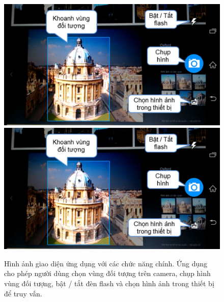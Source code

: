 \begin{figure}[!htbp]
  \begin{center}
    \leavevmode
    \ifpdf
      \includegraphics[scale=0.35]{interface_1}
    \else
      \includegraphics[scale=0.35]{interface_1}
    \fi
    \caption[Hình ảnh ứng dụng với các chức năng chính]{Hình ảnh giao diện ứng dụng với các chức năng chính. Ứng dụng cho phép người dùng chọn vùng đối tượng trên camera, chụp hình vùng đối tượng, bật / tắt đèn flash và chọn hình ảnh trong thiết bị để truy vấn.}
    \label{FigInterface1}
  \end{center}
\end{figure}

